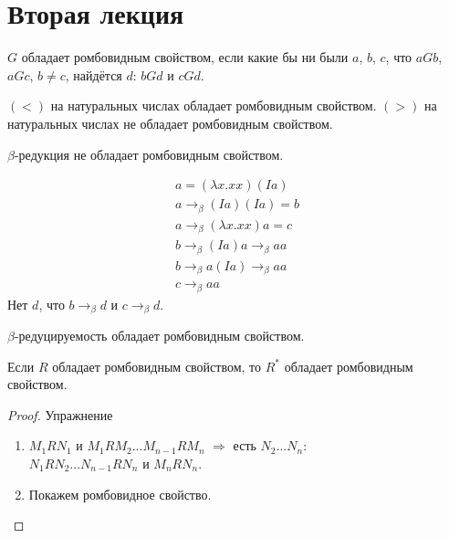 \section{Вторая лекция}

\begin{definition}
    $G$ обладает ромбовидным свойством, если какие бы ни были $a$, $b$, $c$, что $aGb$, $aGc$, $b \ne c$, найдётся $d$: $bGd$ и $cGd$.
\end{definition}

\begin{example}
    $(<)$ на натуральных числах обладает ромбовидным свойством.
    $(>)$ на натуральных числах не обладает ромбовидным свойством.
\end{example}

$\beta$-редукция не обладает ромбовидным свойством.
\begin{example}
    \begin{gather*}
        a = (\lambda x . x x)(Ia) \\
        a \rightarrow_{\beta} (Ia)(Ia) = b\\
        a \rightarrow_{\beta} (\lambda x . x x) a = c \\
        b \rightarrow_{\beta} (Ia)a \rightarrow_{\beta} aa \\
        b \rightarrow_{\beta} a(Ia) \rightarrow_{\beta} aa \\
        c \rightarrow_{\beta} aa
    \end{gather*}
    Нет $d$, что $b \rightarrow_{\beta} d$ и $c \rightarrow_{\beta} d$.
\end{example}

\begin{theorem}
    $\beta$-редуцируемость обладает ромбовидным свойством.
\end{theorem}

\begin{lemma}
    Если $R$ обладает ромбовидным свойством, то $R^{*}$ обладает ромбовидным свойством.
\end{lemma}

\begin{proof} Упражнение %
    \begin{enumerate}
        \item $M_{1}RN_{1}$ и $M_{1}RM_{2}...M_{n-1}RM_{n}$ $\Rightarrow$ есть $N_{2}...N_{n}$: \\
            $N_{1}RN_{2}...N_{n-1}RN_{n}$ и $M_{n}RN_{n}$.
        \item Покажем ромбовидное свойство.
    \end{enumerate}
\end{proof}

